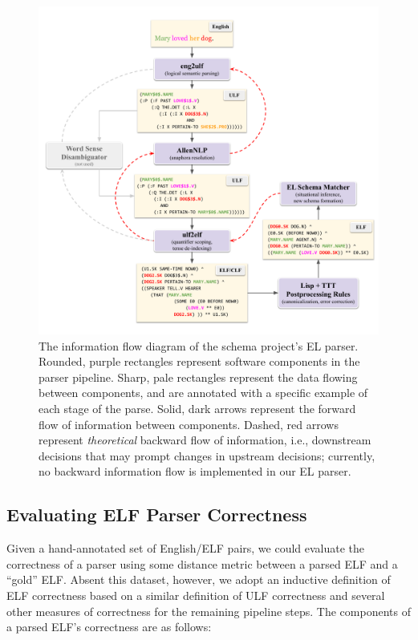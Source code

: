 \begin{figure}
    \centering
    \includegraphics[width=\columnwidth]{CH2_el/parserstages}
    \caption{The information flow diagram of the schema project's EL parser. Rounded, purple rectangles represent software components in the parser pipeline. Sharp, pale rectangles represent the data flowing between components, and are annotated with a specific example of each stage of the parse. Solid, dark arrows represent the forward flow of information between components. Dashed, red arrows represent \textit{theoretical} backward flow of information, i.e., downstream decisions that may prompt changes in upstream decisions; currently, no backward information flow is implemented in our EL parser.}
    \label{fig:my_label}
\end{figure}

\subsection{Evaluating ELF Parser Correctness}
Given a hand-annotated set of English/ELF pairs, we could evaluate the correctness of a parser using some distance metric between a parsed ELF and a ``gold'' ELF. Absent this dataset, however, we adopt an inductive definition of ELF correctness based on a similar definition of ULF correctness and several other measures of correctness for the remaining pipeline steps. The components of a parsed ELF's correctness are as follows:

